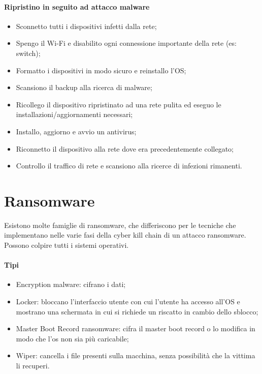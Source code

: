 \paragraph{Ripristino in seguito ad attacco malware}
\begin{itemize}
    \item  Sconnetto tutti i dispositivi infetti dalla rete;
    \item Spengo il Wi-Fi e disabilito ogni connessione importante della rete (es: switch);
    \item Formatto i dispositivi in modo sicuro e reinstallo l'OS;
    \item Scansiono il backup alla ricerca di malware;
    \item Ricollego il dispositivo ripristinato ad una rete pulita ed eseguo le installazioni/aggiornamenti necessari;
    \item Installo, aggiorno e avvio un antivirus;
    \item Riconnetto il dispositivo alla rete dove era precedentemente collegato;
    \item Controllo il traffico di rete e scansiono alla ricerce di infezioni rimanenti.
\end{itemize}

\section{Ransomware}

Esistono molte famiglie di ransomware, che differiscono per le tecniche che implementano nelle varie fasi della cyber kill chain di un attacco ransomware. Possono colpire tutti i sistemi operativi.\\

\paragraph{Tipi}
\begin{itemize}
    \item Encryption malware: cifrano i dati;
    \item Locker: bloccano l'interfaccio utente con cui l'utente ha accesso all'OS e mostrano una schermata in cui si richiede un riscatto in cambio dello sblocco;
    \item Master Boot Record ransomware: cifra il master boot record o lo modifica in modo che l'os non sia più caricabile;
    \item Wiper: cancella i file presenti sulla macchina, senza possibilità che la vittima li recuperi.
\end{itemize}

